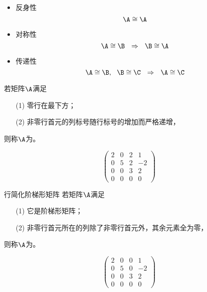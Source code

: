 \begin{xingzhi}[相抵关系的性质]
  \begin{itemize}
  \item 反身性
    $$
    \A\cong\A
    $$
  \item 对称性
    $$
    \A\cong\B ~~\Rightarrow~~ \B\cong\A
    $$
  \item 传递性
    $$
    \A\cong\B,~~\B\cong\C ~~\Rightarrow~~ \A\cong\C
    $$
  \end{itemize}
\end{xingzhi}


\begin{dingyi}[阶梯形矩阵]
  若矩阵$\A$满足
  \begin{itemize}
  \item[(1)] 零行在最下方；
  \item[(2)] 非零行首元的列标号随行标号的增加而严格递增，
  \end{itemize}
  则称$\A$为。
\end{dingyi}

\begin{li}
  $$
  \left(
    \begin{array}{rrrr}
      2&0&2&1\\
      0&5&2&-2\\
      0&0&3&2\\
      0&0&0&0
    \end{array}
  \right)
  $$
\end{li}


\begin{dingyi}{行简化阶梯形矩阵}
  若矩阵$\A$满足
  \begin{itemize}
  \item[(1)] 它是阶梯形矩阵；
  \item[(2)] 非零行首元所在的列除了非零行首元外，其余元素全为零，
  \end{itemize}
  则称$\A$为。
\end{dingyi}

\begin{li}
  $$
  \left(
    \begin{array}{rrrr}
      2&0&0&1\\
      0&5&0&-2\\
      0&0&3&2\\
      0&0&0&0
    \end{array}
  \right)
  $$
\end{li}




